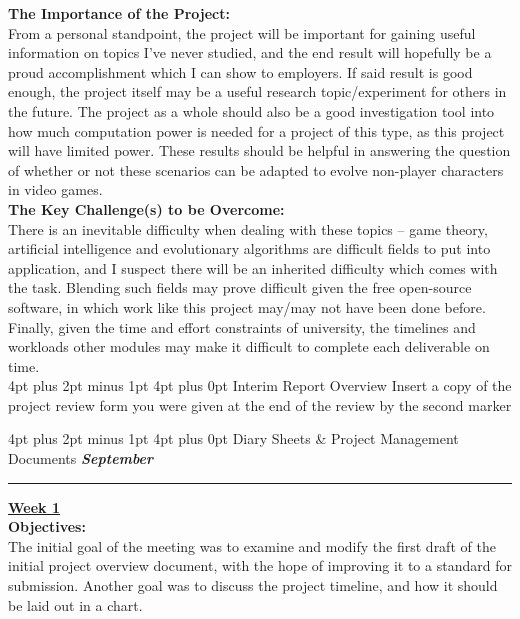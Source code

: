 \documentclass[12pt,a4paper]{article}
\makeatletter
\renewcommand\section{\@startsection {section}{1}{0mm}
                               {4pt plus 2pt minus 1pt}
                               {4pt plus 0pt}
                               {\bfseries}}
\makeatother
\begin{document}
\begin{appendices}
\textbf{The Importance of the Project:} \\
\newline
From a personal standpoint, the project will be important for gaining useful information on topics I’ve never studied, and the end result will hopefully be a proud accomplishment which I can show to employers. If said result is good enough, the project itself may be a useful research topic/experiment for others in the future. The project as a whole should also be a good investigation tool into how much computation power is needed for a project of this type, as this project will have limited power. These results should be helpful in answering the question of whether or not these scenarios can be adapted to evolve non-player characters in video games. \\

\textbf{The Key Challenge(s) to be Overcome:} \\
\newline
There is an inevitable difficulty when dealing with these topics – game theory, artificial intelligence and evolutionary algorithms are difficult fields to put into application, and I suspect there will be an inherited difficulty which comes with the task. Blending such fields may prove difficult given the free open-source software, in which work like this project may/may not have been done before. Finally, given the time and effort constraints of university, the timelines and workloads other modules may make it difficult to complete each deliverable on time. \\

\section{Interim Report Overview}
Insert a copy of the project review form you were given at the end of the review by the second marker

\section{Diary Sheets \& Project Management Documents}
\textbf{\textit{September}}
\newline
\hrule
\textbf{\underline{Week 1}} \\
\newline
\textbf{Objectives:} \\
The initial goal of the meeting was to examine and modify the first draft of the initial project overview document, with the hope of improving it to a standard for submission. 
Another goal was to discuss the project timeline, and how it should be laid out in a chart. \\


\end{appendices}
\end{document}
